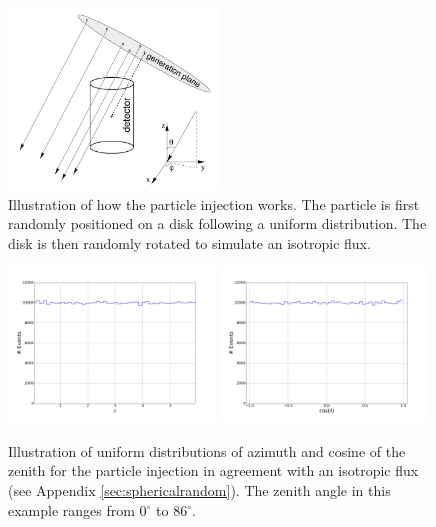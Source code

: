 \begin{figure}[t]
\centering
\includegraphics[width=0.5\textwidth]{chapter6/img/GenerationDisk.png}
\caption{Illustration of how the particle injection works. The particle is first randomly positioned on a disk following a uniform distribution. The disk is then randomly rotated to simulate an isotropic flux.}
\label{fig:injector}
\end{figure}

\begin{figure}[t]
\centering
\includegraphics[width=0.49\textwidth]{chapter6/img/Azimuth}
\includegraphics[width=0.49\textwidth]{chapter6/img/Zenith_full}
\caption{Illustration of uniform distributions of azimuth and cosine of the zenith for the particle injection in agreement with an isotropic flux (see Appendix \ref{sec:sphericalrandom}). The zenith angle in this example ranges from 0$^\circ$ to 86$^\circ$.}
\label{fig:angles}
\end{figure}

